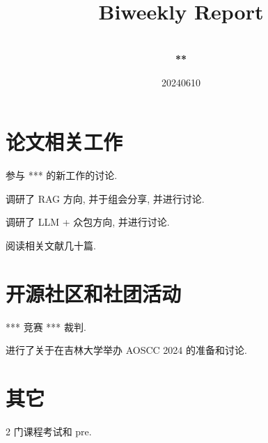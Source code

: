 \documentclass[a4paper]{article}
\title{
    \vspace*{1.0in}
     \\
    \vspace*{1in}
    \textbf{\Huge Biweekly Report}
    \vspace{0.5in}
}
\author{ \\
    \textbf{\huge ***} \\
    \vspace*{1in}
}
\date{\LARGE 20240610}
\begin{document}
\LARGE

\maketitle
\tableofcontents
\thispagestyle{empty}
\newpage

\section{论文相关工作}

参与 *** 的新工作的讨论.

调研了 RAG 方向, 并于组会分享, 并进行讨论.

调研了 LLM + 众包方向, 并进行讨论.

阅读相关文献几十篇.

\section{开源社区和社团活动}

*** 竞赛 *** 裁判.

进行了关于在吉林大学举办 AOSCC 2024 的准备和讨论.

\section{其它}

2 门课程考试和 pre.
\end{document}
